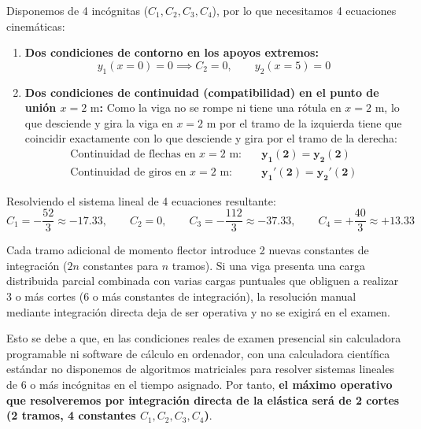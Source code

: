 {    

    Disponemos de 4 incógnitas ($C_1, C_2, C_3, C_4$), por lo que necesitamos 4 ecuaciones cinemáticas:
    \begin{enumerate}
        \item \textbf{Dos condiciones de contorno en los apoyos extremos:}
              \begin{equation}
                  y_1(x = 0) = 0 \implies C_2 = 0, \qquad y_2(x = 5) = 0
              \end{equation}
        \item \textbf{Dos condiciones de continuidad (compatibilidad) en el punto de unión $x = 2\text{ m}$:} Como la viga no se rompe ni tiene una rótula en $x = 2\text{ m}$, lo que desciende y gira la viga en $x = 2\text{ m}$ por el tramo de la izquierda tiene que coincidir exactamente con lo que desciende y gira por el tramo de la derecha:
              \begin{align}
                  \text{Continuidad de flechas en } x = 2\text{ m:} \quad & \mathbf{y_1(2) = y_2(2)}   \\
                  \text{Continuidad de giros en } x = 2\text{ m:} \quad   & \mathbf{y_1'(2) = y_2'(2)}
              \end{align}
    \end{enumerate}
    Resolviendo el sistema lineal de 4 ecuaciones resultante:
    \begin{equation}
        C_1 = -\frac{52}{3} \approx -17.33, \qquad C_2 = 0, \qquad C_3 = -\frac{112}{3} \approx -37.33, \qquad C_4 = +\frac{40}{3} \approx +13.33
    \end{equation}

    \begin{tcolorbox}[colback=yellow!10, colframe=orange!85!black, title=\textbf{Alcance Operativo en Problemas con Múltiples Cortes}]
        Cada tramo adicional de momento flector introduce 2 nuevas constantes de integración ($2n$ constantes para $n$ tramos). Si una viga presenta una carga distribuida parcial combinada con varias cargas puntuales que obliguen a realizar 3 o más cortes (6 o más constantes de integración), la resolución manual mediante integración directa deja de ser operativa y no se exigirá en el examen.

        Esto se debe a que, en las condiciones reales de examen presencial sin calculadora programable ni software de cálculo en ordenador, con una calculadora científica estándar no disponemos de algoritmos matriciales para resolver sistemas lineales de 6 o más incógnitas en el tiempo asignado. Por tanto, \textbf{el máximo operativo que resolveremos por integración directa de la elástica será de 2 cortes (2 tramos, 4 constantes $C_1, C_2, C_3, C_4$)}.


\end{tcolorbox}}
